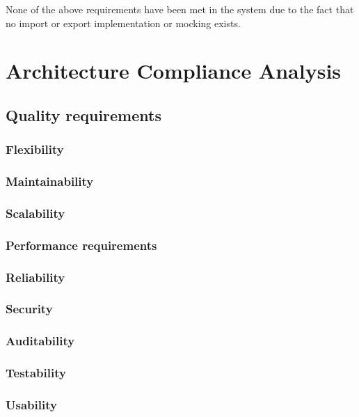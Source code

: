 \documentclass[a4paper,10pt]{article}
\begin{document}
None of the above requirements have been met in the system due to the fact that no import or export implementation or mocking exists.

\section{Architecture Compliance Analysis}
\subsection{Quality requirements}
\subsubsection{Flexibility}

\subsubsection{Maintainability}

\subsubsection{Scalability}

\subsubsection{Performance requirements}

\subsubsection{Reliability}

\subsubsection{Security}

\subsubsection{Auditability}

\subsubsection{Testability}

\subsubsection{Usability}
\end{document}
